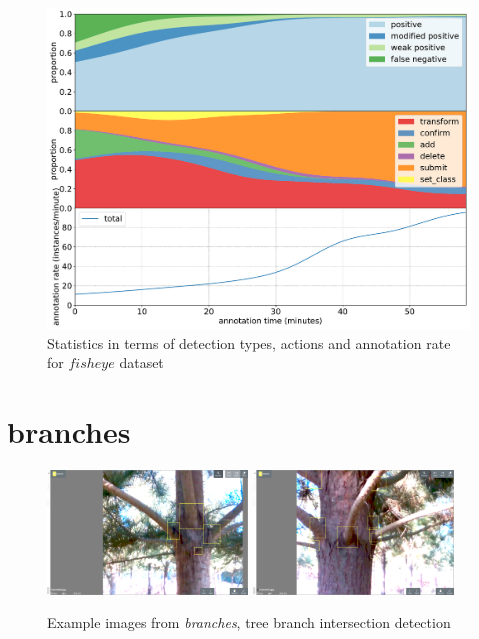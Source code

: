 \begin{figure}[!h]
\centering
\includegraphics[width=1.0\linewidth]{charts/action_annotations/fisheye.pdf}
\caption{Statistics in terms of detection types, actions and annotation rate for $fisheye$ dataset}
\label{fig:fisheye_annotation}
\end{figure}


\pagebreak
\section{branches}
\label{sec:branches_details}


\begin{figure}[!h]
  \includegraphics[width=0.475\textwidth]{figures/annotation/screenshots/branches3.png}
  \includegraphics[width=0.475\textwidth]{figures/annotation/screenshots/branches2.png}  
  
  \caption{Example images from \emph{branches}, tree branch intersection detection}
\end{figure}

